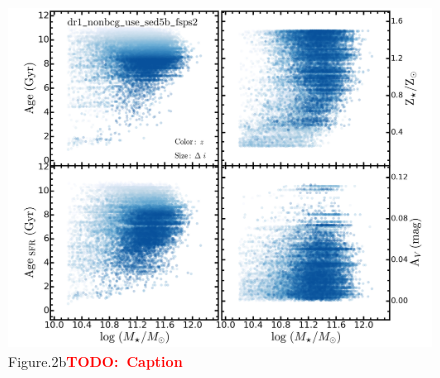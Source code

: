 \documentclass[preprint]{aastex}
\newcommand{\todo}[1]{\textcolor{red}{\textbf{TODO:~#1}}}
\begin{document}
\begin{CJK*}{UTF8}{gbsn}
\begin{figure}
    \centering 
    \includegraphics[width=11.5cm]{fig/dr1_nonbcg_use_sed5b_fsps2_logm_plots}
    \caption{Figure.2b\todo{Caption}}\label{figure:2b}
\end{figure}


\end{CJK*}

\clearpage 

%

\label{lastpage}
\end{document}
